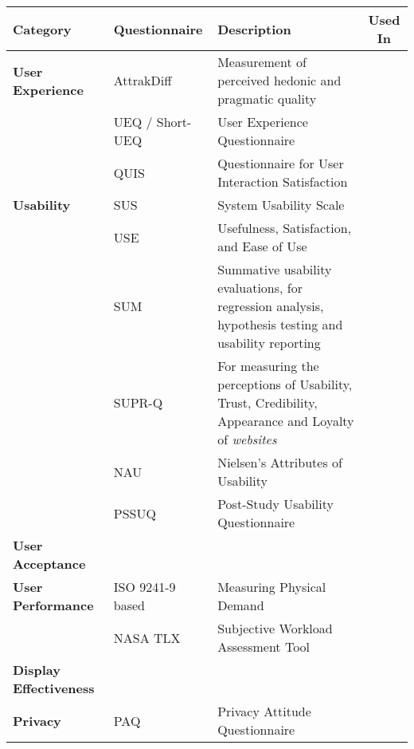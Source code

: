 \begin{tabular}{p{3.5cm}p{5cm}p{7cm}c}
\toprule
\textbf{Category} & \textbf{Questionnaire} & \textbf{Description} & \textbf{Used In} \\ \midrule





\textbf{User Experience} & AttrakDiff \cite{hassenzahl2003attrakdiff} & Measurement of perceived hedonic and pragmatic quality & \cite{Beyer2011}   \\
& UEQ / Short-UEQ \cite{UEQSurvey} & User Experience Questionnaire &    \\ 
& QUIS \cite{harper1993improving} & Questionnaire for User Interaction Satisfaction  &  \\ \hline




\textbf{Usability} & SUS &  System Usability Scale & \cite{alt2011digifieds}  \\
& USE & Usefulness, Satisfaction, and Ease of Use  & \\
& SUM \cite{sauro2005method} &  Summative usability evaluations, for regression analysis, hypothesis testing and usability reporting &  \\
& SUPR-Q \cite{SUPRQSurvey} &  For measuring the perceptions of Usability, Trust, Credibility, Appearance and Loyalty of \textit{websites}  & \\
& NAU \cite{nielsen1994usability} & Nielsen's Attributes of Usability & \\
& PSSUQ \cite{Garcia2013UXResearch} & Post-Study Usability Questionnaire & \\ \hline


\textbf{User Acceptance} &  &  &  \\ \hline



\textbf{User Performance} & ISO 9241-9 based \cite{chamsaz2010empirical} & Measuring Physical Demand & \cite{natapov2009iso, kratz2012palmspace} \\
& NASA TLX \cite{SurveyNASATLX} & Subjective Workload Assessment Tool & \cite{bailly2012shoesense} \\ \hline




\textbf{Display Effectiveness} &  &   &   \\ \hline



\textbf{Privacy} & PAQ \cite{chignell2003privacy} & Privacy Attitude Questionnaire &   \\ \hline




\end{tabular}

